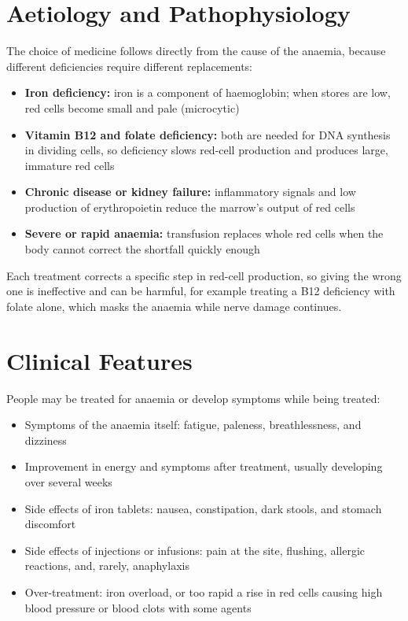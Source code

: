 \section*{Aetiology and Pathophysiology}
The choice of medicine follows directly from the cause of the anaemia, because different deficiencies require different replacements:
\begin{itemize}
    \item \textbf{Iron deficiency:} iron is a component of haemoglobin; when stores are low, red cells become small and pale (microcytic)
    \item \textbf{Vitamin B12 and folate deficiency:} both are needed for DNA synthesis in dividing cells, so deficiency slows red-cell production and produces large, immature red cells
    \item \textbf{Chronic disease or kidney failure:} inflammatory signals and low production of erythropoietin reduce the marrow's output of red cells
    \item \textbf{Severe or rapid anaemia:} transfusion replaces whole red cells when the body cannot correct the shortfall quickly enough
\end{itemize}
Each treatment corrects a specific step in red-cell production, so giving the wrong one is ineffective and can be harmful, for example treating a B12 deficiency with folate alone, which masks the anaemia while nerve damage continues.

\section*{Clinical Features}
People may be treated for anaemia or develop symptoms while being treated:
\begin{itemize}
    \item Symptoms of the anaemia itself: fatigue, paleness, breathlessness, and dizziness
    \item Improvement in energy and symptoms after treatment, usually developing over several weeks
    \item Side effects of iron tablets: nausea, constipation, dark stools, and stomach discomfort
    \item Side effects of injections or infusions: pain at the site, flushing, allergic reactions, and, rarely, anaphylaxis
    \item Over-treatment: iron overload, or too rapid a rise in red cells causing high blood pressure or blood clots with some agents
\end{itemize}

